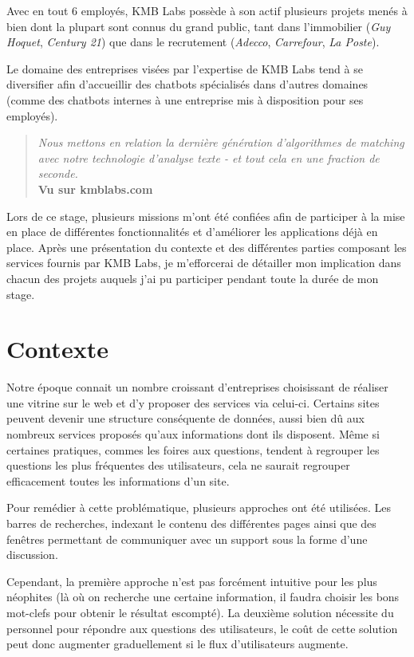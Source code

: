 \documentclass[12pt,a4paper,oneside]{scrreprt}
\begin{document}
Avec en tout 6 employés, KMB Labs possède à son actif plusieurs projets menés à bien dont la plupart sont connus du grand public, tant dans l'immobilier (\textit{Guy Hoquet}, \textit{Century 21}) que dans le recrutement (\textit{Adecco}, \textit{Carrefour}, \textit{La Poste}).

Le domaine des entreprises visées par l'expertise de KMB Labs tend à se diversifier afin d'accueillir des chatbots spécialisés dans d'autres domaines (comme des chatbots internes à une entreprise mis à disposition pour ses employés).

\begin{quote}
	\og \textit{Nous mettons en relation la dernière génération d'algorithmes de matching avec notre technologie d'analyse texte - et tout cela en une fraction de seconde.}\fg{}\\
	\textbf{Vu sur kmblabs.com}
\end{quote}

Lors de ce stage, plusieurs missions m'ont été confiées afin de participer à la mise en place de différentes fonctionnalités et d'améliorer les applications déjà en place. Après une présentation du contexte et des différentes parties composant les services fournis par KMB Labs, je m'efforcerai de détailler mon implication dans chacun des projets auquels j'ai pu participer pendant toute la durée de mon stage.

\chapter{Contexte}
Notre époque connait un nombre croissant d'entreprises choisissant de réaliser une vitrine sur le web et d'y proposer des services via celui-ci. Certains sites peuvent devenir une structure conséquente de données, aussi bien dû aux nombreux services proposés qu'aux informations dont ils disposent. Même si certaines pratiques, commes les foires aux questions, tendent à regrouper les questions les plus fréquentes des utilisateurs, cela ne saurait regrouper efficacement toutes les informations d'un site.

Pour remédier à cette problématique, plusieurs approches ont été utilisées. Les barres de recherches, indexant le contenu des différentes pages ainsi que des fenêtres permettant de communiquer avec un support sous la forme d'une discussion.

Cependant, la première approche n'est pas forcément intuitive pour les plus néophites (là où on recherche une certaine information, il faudra choisir les bons mot-clefs pour obtenir le résultat escompté). La deuxième solution nécessite du personnel pour répondre aux questions des utilisateurs, le coût de cette solution peut donc augmenter graduellement si le flux d'utilisateurs augmente.
\end{document}
